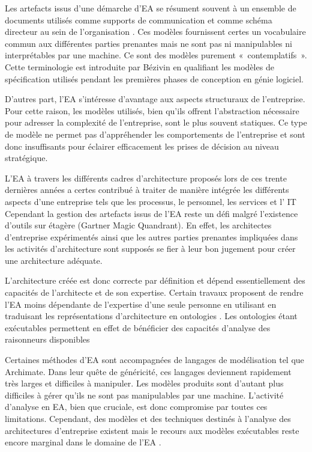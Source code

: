 Les artefacts issus d'une démarche d'EA se résument souvent à un ensemble de 
documents utilisés comme supports de communication et comme schéma directeur au 
sein de l'organisation \cite{kulkarni_modelling_2013} \cite{clark_towards_2014}. 
Ces modèles fournissent certes un vocabulaire commun aux différentes parties 
prenantes mais ne sont pas ni manipulables ni interprétables par une machine. Ce 
sont des modèles purement «~contemplatifs~». Cette terminologie est introduite 
par Bézivin en qualifiant les modèles de spécification utilisés pendant les 
premières phases de conception en génie logiciel. 

D'autres part, l'EA s'intéresse d'avantage aux aspects structuraux de 
l'entreprise. Pour cette raison, les modèles utilisés, bien qu'ils offrent 
l'abstraction nécessaire pour adresser la complexité de l'entreprise, sont le 
plus souvent statiques. Ce type de modèle ne permet pas d'appréhender les 
comportements de l'entreprise et sont donc insuffisants pour éclairer 
efficacement les prises de décision au niveau stratégique.

L'EA à travers les différents cadres d'architecture proposés lors de ces trente 
dernières années a certes contribué à traiter de manière intégrée les différents 
aspects d'une entreprise tels que les processus, le personnel, les services et 
l' IT Cependant la gestion des artefacts issus de l'EA reste un défi 
\cite{zachman1997enterprise} malgré l'existence d'outils sur étagère (Gartner 
Magic Quandrant). En effet, les architectes d'entreprise expérimentés ainsi que 
les autres parties prenantes impliquées dans les activités d'architecture sont 
supposés se fier à leur bon jugement pour créer une architecture adéquate. 

L'architecture créée est donc correcte par définition et dépend essentiellement 
des capacités de l'architecte et de son expertise. Certain travaux proposent de 
rendre l'EA moins dépendante de l'expertise d'une seule personne en utilisant en 
traduisant les représentations d'architecture en ontologies 
\cite{sunkle_analyzing_2013}. Les ontologies étant exécutables permettent en 
effet de bénéficier des capacités d'analyse des raisonneurs disponibles 

Certaines méthodes d'EA sont accompagnées de langages de modélisation tel que 
Archimate. Dans leur quête de généricité, ces langages deviennent rapidement 
très larges et difficiles à manipuler. Les modèles produits sont d'autant plus 
difficiles à gérer qu'ils ne sont pas manipulables par une machine. L'activité 
d'analyse en EA, bien que cruciale, est donc compromise par toutes ces 
limitations. Cependant, des modèles et des techniques destinés à l'analyse des 
architectures d'entreprise existent mais le recours aux modèles exécutables 
reste encore marginal dans le domaine de l'EA \cite{kulkarni2013modelling}.

